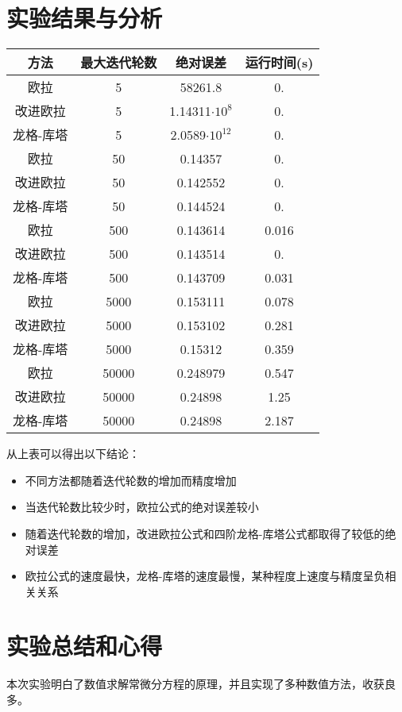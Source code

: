 \documentclass[reportComp]{thesis}
\begin{document}
\section{实验结果与分析}
\begin{center}
\begin{tabular}{|c|c|c|c|}\hline
\textbf{方法} & \textbf{最大迭代轮数} & \textbf{绝对误差} & \textbf{运行时间(s)}\\\hline\hline
欧拉 & 5	& 58261.8	 & 0.\\\hline
改进欧拉 & 5	& 1.14311$\cdot 10^8$	 & 0.\\\hline
龙格-库塔 & 5	& 2.0589$\cdot 10^{12}$	 & 0.\\\hline\hline
欧拉 & 50	& 0.14357	 & 0.\\\hline
改进欧拉 & 50	& 0.142552	 & 0.\\\hline
龙格-库塔 & 50	& 0.144524	 & 0.\\\hline\hline
欧拉 & 500	& 0.143614	 & 0.016\\\hline
改进欧拉 & 500	& 0.143514	 & 0.\\\hline
龙格-库塔 & 500	& 0.143709	 & 0.031\\\hline\hline
欧拉 & 5000	& 0.153111	 & 0.078\\\hline
改进欧拉 & 5000	& 0.153102	 & 0.281\\\hline
龙格-库塔 & 5000	& 0.15312	 & 0.359\\\hline\hline
欧拉 & 50000	& 0.248979	 & 0.547\\\hline
改进欧拉 & 50000	& 0.24898	 & 1.25\\\hline
龙格-库塔 & 50000	& 0.24898	 & 2.187\\\hline
\end{tabular}
\end{center}

从上表可以得出以下结论：
\begin{itemize}
	\item 不同方法都随着迭代轮数的增加而精度增加
	\item 当迭代轮数比较少时，欧拉公式的绝对误差较小
	\item 随着迭代轮数的增加，改进欧拉公式和四阶龙格-库塔公式都取得了较低的绝对误差
	\item 欧拉公式的速度最快，龙格-库塔的速度最慢，某种程度上速度与精度呈负相关关系
\end{itemize}

\section{实验总结和心得}
本次实验明白了数值求解常微分方程的原理，并且实现了多种数值方法，收获良多。
\end{document}
